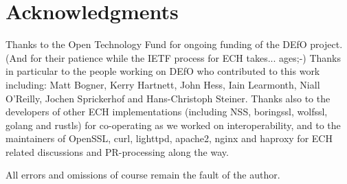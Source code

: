 \section*{Acknowledgments}

Thanks to the Open Technology Fund for ongoing funding of the DEfO
project. (And for their patience while the IETF process for ECH takes...
ages;-)
Thanks in particular to the people working on DEfO who contributed to this work
including:
Matt Bogner,
Kerry Hartnett,
John Hess,
Iain Learmonth,
Niall O'Reilly,
Jochen Sprickerhof
and Hans-Christoph Steiner.
Thanks also to the developers of other ECH implementations (including
NSS, boringssl, wolfssl, golang and rustls) for co-operating as we worked on
interoperability, and to the maintainers of OpenSSL, curl, lighttpd, apache2,
nginx and haproxy for ECH related discussions and PR-processing along the way.

All errors and omissions of course remain the fault of the author.
